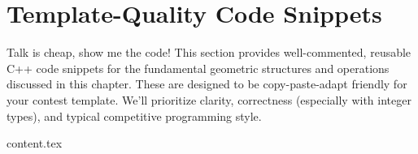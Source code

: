 \clearpage
\section{Template-Quality Code Snippets}
\label{sec:A.5}

Talk is cheap, show me the code! This section provides well-commented, reusable C++ code snippets for the fundamental geometric structures and operations discussed in this chapter. These are designed to be copy-paste-adapt friendly for your contest template. We'll prioritize clarity, correctness (especially with integer types), and typical competitive programming style.

{content.tex}

